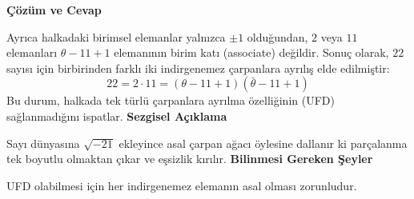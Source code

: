 \documentclass[11pt, a4paper]{article}
\newenvironment{cozum}{
    \vspace{0.5cm}
    \noindent\textcolor{green!60!black}{\faCheckCircle\enspace \textbf{\Large Çözüm ve Cevap}}\par\vspace{0.2cm}
}{}
\newenvironment{sezgisel}{
    \vspace{0.5cm}
    \noindent\textcolor{orange!80!black}{\faLightbulb\enspace \textbf{\Large Sezgisel Açıklama}}\par\vspace{0.2cm}
    \itshape
}{}
\newenvironment{bilgi}{
    \vspace{0.5cm}
    \noindent\textcolor{red!70!black}{\faExclamationTriangle\enspace \textbf{\Large Bilinmesi Gereken Şeyler}}\par\vspace{0.2cm}
}{}
\begin{document}
\begin{cozum}
Ayrıca halkadaki birimsel elemanlar yalnızca $\pm 1$ olduğundan, $2$ veya $11$ elemanları $\theta - 11 + 1$ elemanının birim katı (associate) değildir. Sonuç olarak, $22$ sayısı için birbirinden farklı iki indirgenemez çarpanlara ayrılış elde edilmiştir:
\[ 22 = 2 \cdot 11 = (\theta - 11 + 1)(\bar{\theta} - 11 + 1) \]
Bu durum, halkada tek türlü çarpanlara ayrılma özelliğinin (UFD) sağlanmadığını ispatlar.
\end{cozum}
\begin{sezgisel}
Sayı dünyasına $\sqrt{-21}$ ekleyince asal çarpan ağacı öylesine dallanır ki parçalanma tek boyutlu olmaktan çıkar ve eşsizlik kırılır.
\end{sezgisel}
\begin{bilgi}
UFD olabilmesi için her indirgenemez elemanın asal olması zorunludur.
\end{bilgi}

\newpage
\end{document}
